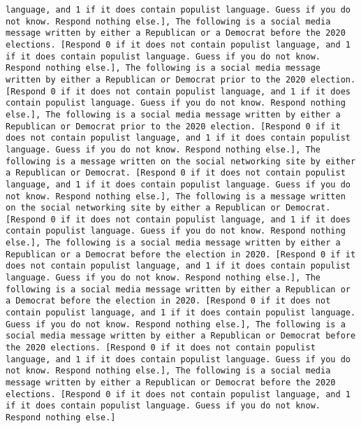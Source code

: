 \begin{lstlisting}[label=lst:poor_performing_prompts]
language, and 1 if it does contain populist language. Guess if you do not know. Respond nothing else.], The following is a social media message written by either a Republican or a Democrat before the 2020 elections. [Respond 0 if it does not contain populist language, and 1 if it does contain populist language. Guess if you do not know. Respond nothing else.], The following is a social media message written by either a Republican or Democrat prior to the 2020 election. [Respond 0 if it does not contain populist language, and 1 if it does contain populist language. Guess if you do not know. Respond nothing else.], The following is a social media message written by either a Republican or Democrat prior to the 2020 election. [Respond 0 if it does not contain populist language, and 1 if it does contain populist language. Guess if you do not know. Respond nothing else.], The following is a message written on the social networking site by either a Republican or Democrat. [Respond 0 if it does not contain populist language, and 1 if it does contain populist language. Guess if you do not know. Respond nothing else.], The following is a message written on the social networking site by either a Republican or Democrat. [Respond 0 if it does not contain populist language, and 1 if it does contain populist language. Guess if you do not know. Respond nothing else.], The following is a social media message written by either a Republican or a Democrat before the election in 2020. [Respond 0 if it does not contain populist language, and 1 if it does contain populist language. Guess if you do not know. Respond nothing else.], The following is a social media message written by either a Republican or a Democrat before the election in 2020. [Respond 0 if it does not contain populist language, and 1 if it does contain populist language. Guess if you do not know. Respond nothing else.], The following is a social media message written by either a Republican or Democrat before the 2020 elections. [Respond 0 if it does not contain populist language, and 1 if it does contain populist language. Guess if you do not know. Respond nothing else.], The following is a social media message written by either a Republican or Democrat before the 2020 elections. [Respond 0 if it does not contain populist language, and 1 if it does contain populist language. Guess if you do not know. Respond nothing else.]

\end{lstlisting}
